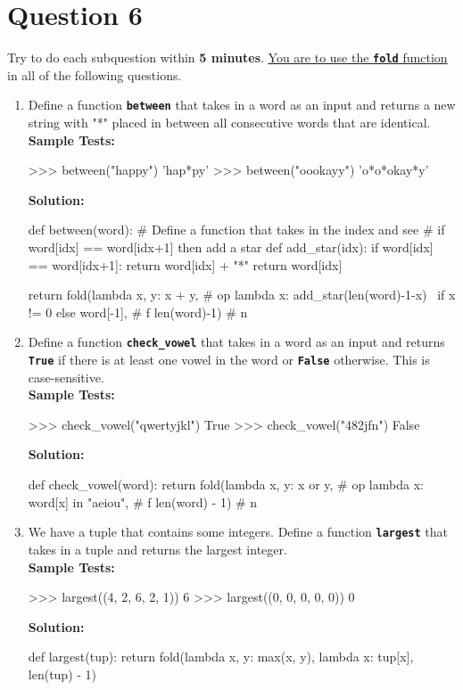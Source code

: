 \section{Question 6}
Try to do each subquestion within \textbf{5 minutes}. \underline{You are to use the \texttt{\bfseries fold}
function} in all of the following questions.
\begin{enumerate}
\item Define a function \texttt{\bfseries between} that takes in a word as an input and returns a new
string with "*" placed in between all consecutive words that are identical. \\
\textbf{Sample Tests:}
\begin{python}
>>> between("happy")
'hap*py'
>>> between("oookayy")
'o*o*okay*y'
\end{python}
\textbf{Solution:}
\begin{python}
def between(word):
    # Define a function that takes in the index and see
    # if word[idx] == word[idx+1] then add a star
    def add_star(idx):
        if word[idx] == word[idx+1]:
            return word[idx] + "*"
        return word[idx]
    
    return fold(lambda x, y: x + y,                 # op
                lambda x: add_star(len(word)-1-x) \
                          if x != 0 else word[-1],  # f
                len(word)-1)                        # n
\end{python}

\item Define a function \texttt{\bfseries check\_vowel} that takes in a word as an input and returns
\texttt{\bfseries True} if there is at least one vowel in the word or \texttt{\bfseries False} otherwise. This is
case-sensitive. \\
\textbf{Sample Tests:}
\begin{python}
>>> check_vowel("qwertyjkl")
True
>>> check_vowel("482jfn")
False
\end{python}
\textbf{Solution:}
\begin{python}
def check_vowel(word):
    return fold(lambda x, y: x or y,            # op
                lambda x: word[x] in "aeiou",   # f
                len(word) - 1)                  # n
\end{python}

\item We have a tuple that contains some integers. Define a function \texttt{\bfseries largest} that
takes in a tuple and returns the largest integer. \\
\textbf{Sample Tests:}
\begin{python}
>>> largest((4, 2, 6, 2, 1))
6
>>> largest((0, 0, 0, 0, 0))
0
\end{python}
\textbf{Solution:}
\begin{python}
def largest(tup):
    return fold(lambda x, y: max(x, y), lambda x: tup[x], len(tup) - 1)
\end{python}
\end{enumerate}

